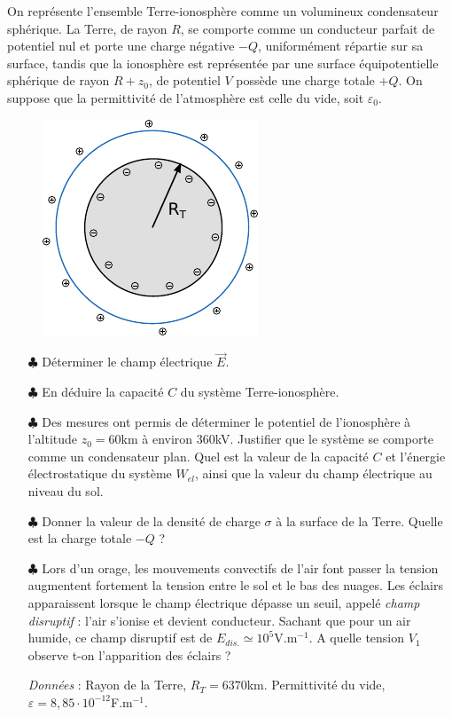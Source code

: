 \documentclass{report}
\begin{document}
On représente l'ensemble Terre-ionosphère comme un volumineux condensateur sphérique. La Terre, de rayon $R$, se comporte comme un conducteur parfait de potentiel nul et porte une charge négative $-Q$, uniformément répartie sur sa surface, tandis que la ionosphère est représentée par une surface équipotentielle sphérique de rayon $R+z_0$, de potentiel $V$ possède une charge totale $+Q$. On suppose que la permittivité de l'atmosphère est celle du vide, soit $\varepsilon_0$. 

\begin{figure}[h!]
\centering
		\includegraphics[scale=1]{em3.pdf}
\end{figure}

\begin{itemize}
	
	\item[$\clubsuit$] Déterminer le champ électrique $\vec{E}$.
		
	\item[$\clubsuit$] En déduire la capacité $C$ du système Terre-ionosphère.
	
	\item[$\clubsuit$] Des mesures ont permis de déterminer le potentiel de l'ionosphère à l'altitude $z_0=60$km à environ 360kV. Justifier que le système se comporte comme un condensateur plan. Quel est la valeur de la capacité $C$ et l'énergie électrostatique du système $W_{el}$, ainsi que la valeur du champ électrique au niveau du sol.
	
	\item[$\clubsuit$] Donner la valeur de la densité de charge $\sigma$ à la surface de la Terre. Quelle est la charge totale $-Q$ ?
	
	\item[$\clubsuit$] Lors d'un orage, les mouvements convectifs de l'air font passer la tension augmentent fortement la tension entre le sol et le bas des nuages. Les éclairs apparaissent lorsque le champ électrique dépasse un seuil, appelé \textit{champ disruptif} : l'air s'ionise et devient conducteur. Sachant que pour un air humide, ce champ disruptif est de $E_{dis.}\simeq10^{5}$V.m$^{-1}$. A quelle tension $V_1$ observe t-on l'apparition des éclairs ?
	
	
	\textit{Données} : Rayon de la Terre, $R_T=6370$km. Permittivité du vide, $\varepsilon=8,85\cdot10^{-12}$F.m$^{-1}$.
	
\end{itemize}
\end{document}
